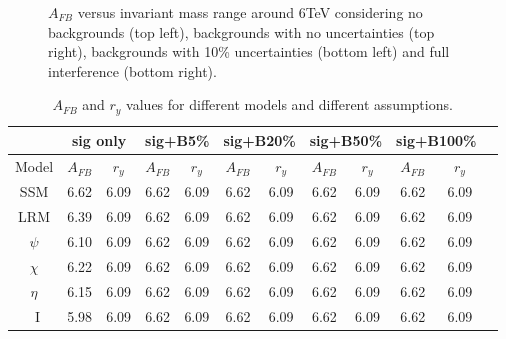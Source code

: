 \begin{figure}[!htb]
  \caption{$A_{FB}$ versus invariant mass range around 6TeV considering no backgrounds (top left), backgrounds with no uncertainties (top right), backgrounds with 10\% uncertainties (bottom left) and full interference (bottom right).}
  \label{figure:lepana:afb_dm}
\end{figure}


\begin{table}
\centering
\begin{tabular}{| c | c | c | c | c | c | c | c | c | c | c | c |} \hline\hline
 & \multicolumn{2}{c|}{sig only}  & \multicolumn{2}{c|}{sig+B5\%} & \multicolumn{2}{c|}{sig+B20\%} & \multicolumn{2}{c|}{sig+B50\%} & \multicolumn{2}{c|}{sig+B100\%}\\

\hline
  Model &  $A_{FB}$   &  $r_y$   &  $A_{FB}$   &  $r_y$&  $A_{FB}$   &  $r_y$&  $A_{FB}$   &  $r_y$&  $A_{FB}$   &  $r_y$ \\
\hline
SSM    &     6.62     &  6.09   &     6.62     &  6.09&     6.62     &  6.09&     6.62     &  6.09&     6.62     &  6.09      \\
LRM    &   6.39       &  6.09   &     6.62     &  6.09&     6.62     &  6.09&     6.62     &  6.09&     6.62     &  6.09 \\
$\psi$    &  6.10   &  6.09   &     6.62     &  6.09&     6.62     &  6.09&     6.62     &  6.09&     6.62     &  6.09   \\
$\chi$   &  6.22    &  6.09   &     6.62     &  6.09&     6.62     &  6.09&     6.62     &  6.09&     6.62     &  6.09    \\
$\eta$   &  6.15     &  6.09   &     6.62     &  6.09&     6.62     &  6.09&     6.62     &  6.09&     6.62     &  6.09    \\
~I        & 5.98   &  6.09   &     6.62     &  6.09&     6.62     &  6.09&     6.62     &  6.09&     6.62     &  6.09   \\
\hline\hline
\end{tabular}
\caption{$A_{FB}$ and $r_y$ values for different models and different assumptions.}
\label{tab:leptonicresonances:comp}
\end{table}


